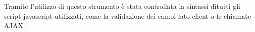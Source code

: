 Tramite l’utilizzo di questo strumento è stata controllata la sintassi ditutti gli script javascript utilizzati, come la validazione dei campi
lato client o le chiamate AJAX.